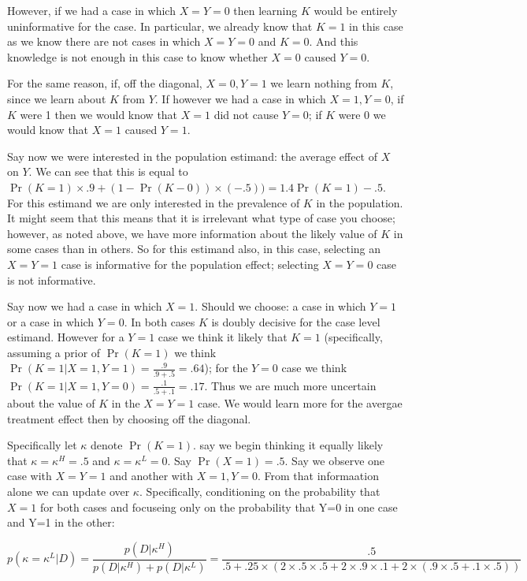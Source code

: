 \documentclass[
  12pt,
]{book}
\begin{document}
However, if we had a case in which \(X=Y=0\) then learning \(K\) would be entirely uninformative for the case. In particular, we already know that \(K=1\) in this case as we know there are not cases in which \(X=Y=0\) and \(K=0\). And this knowledge is not enough in this case to know whether \(X=0\) caused \(Y=0\).

For the same reason, if, off the diagonal, \(X=0, Y=1\) we learn nothing from \(K\), since we learn about \(K\) from \(Y\). If however we had a case in which \(X=1, Y=0\), if \(K\) were 1 then we would know that \(X=1\) did not cause \(Y=0\); if \(K\) were 0 we would know that \(X=1\) caused \(Y=1\).

Say now we were interested in the population estimand: the average effect of \(X\) on \(Y\). We can see that this is equal to \(\Pr(K=1)\times.9 + (1-\Pr(K-0))\times(-.5)) = 1.4\Pr(K=1)-.5\). For this estimand we are only interested in the prevalence of \(K\) in the population. It might seem that this means that it is irrelevant what type of case you choose; however, as noted above, we have more information about the likely value of \(K\) in some cases than in others. So for this estimand also, in this case, selecting an \(X=Y=1\) case is informative for the population effect; selecting \(X=Y=0\) case is not informative.

Say now we had a case in which \(X=1\). Should we choose: a case in which \(Y=1\) or a case in which \(Y=0\). In both cases \(K\) is doubly decisive for the case level estimand. However for a \(Y=1\) case we think it likely that \(K=1\) (specifically, assuming a prior of \(\Pr(K=1)\) we think \(\Pr(K=1 | X=1, Y=1) = \frac{.9}{.9+.5}=.64\)); for the \(Y=0\) case we think \(\Pr(K=1 | X=1, Y=0) = \frac{.1}{.5+.1}=.17\). Thus we are much more uncertain about the value of \(K\) in the \(X=Y=1\) case. We would learn more for the avergae treatment effect then by choosing off the diagonal.

Specifically let \(\kappa\) denote \(\Pr(K=1)\). say we begin thinking it equally likely that \(\kappa=\kappa^H = .5\) and \(\kappa=\kappa^L=0\). Say \(\Pr(X=1) = .5\). Say we observe one case with \(X=Y=1\) and another with \(X=1, Y=0\). From that informaation alone we can update over \(\kappa\). Specifically, conditioning on the probability that \(X=1\) for both cases and focuseing only on the probability that Y=0 in one case and Y=1 in the other:

\[p(\kappa = \kappa^L|D) =  \frac{p(D|\kappa^H)}{p(D|\kappa^H)+p(D|\kappa^L)}=\frac{.5}{.5 + .25\times(2\times.5\times.5 + 2\times.9\times.1 + 2\times(.9\times.5 +.1\times.5))}\]
\end{document}
